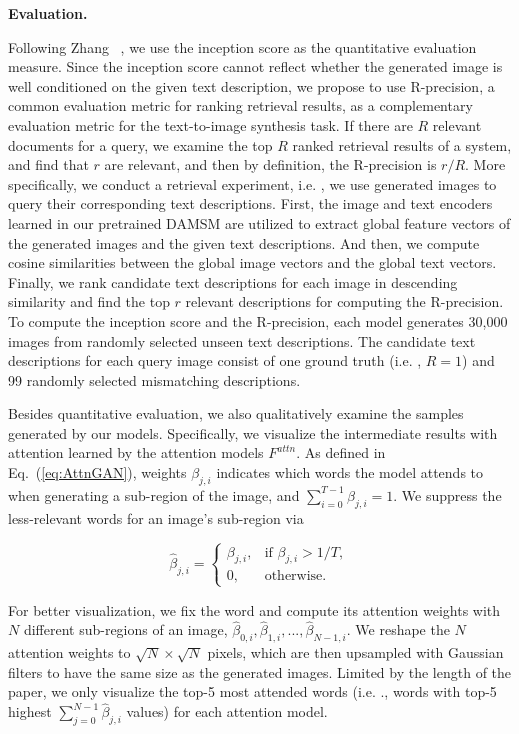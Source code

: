 \textbf{Evaluation. }{ Following Zhang \etal~\cite{Han16stackgan}, we use the inception score \cite{Salimans2016} as the quantitative evaluation measure. Since the inception score cannot reflect whether the generated image is well conditioned on the given text description, we propose to use R-precision, a common evaluation metric for ranking retrieval results, as a complementary evaluation metric for the text-to-image synthesis task. If there are $R$ relevant documents for a query, we examine the top $R$ ranked retrieval results of a system, and find that $r$ are relevant, and then by definition, the R-precision is ${r}/{R}$. More specifically, we conduct a retrieval experiment, i.e. , we use generated images to query their corresponding text descriptions. First, the image and text encoders learned in our pretrained DAMSM are utilized to extract global feature vectors of the generated images and the given text descriptions. And then, we compute cosine similarities between the global image vectors and the global text vectors. Finally, we rank candidate text descriptions for each image in descending similarity and find the top $r$ relevant descriptions for computing the R-precision. To compute the inception score and the R-precision, each model generates 30,000 images from randomly selected unseen text descriptions. The candidate text descriptions for each query image consist of one ground truth (i.e. , $R=1$) and 99 randomly selected mismatching descriptions. 

Besides quantitative evaluation, we also qualitatively examine the samples generated by our models.  Specifically, we visualize the intermediate results with attention learned by the attention models $F^{attn}$. As defined in Eq.~(\ref{eq:AttnGAN}), weights $\beta_{j,i}$ indicates which words the model attends to when generating a sub-region of the image, and $\sum_{i=0}^{T-1} \beta_{j,i} = 1$. We suppress the less-relevant words for an image's sub-region via

\begin{equation}\label{eq:suppress}
    \hat{\beta}_{j,i} = 
        \begin{cases}
            \beta_{j,i}, & \text{if } \beta_{j,i} > 1/T,\\
                0,              & \text{otherwise.}
        \end{cases}
 \end{equation}

For better visualization, we fix the word and compute its attention weights with $N$ different sub-regions of an image, $\hat{\beta}_{0,i}, \hat{\beta}_{1,i}, ..., \hat{\beta}_{N-1,i}$. We reshape the $N$ attention weights to $\sqrt{N}\times\sqrt{N}$ pixels, which are then upsampled with Gaussian filters to have the same size as the generated images. Limited by the length of the paper, we only visualize the top-5 most attended words (i.e. ., words with top-5 highest $\sum_{j=0}^{N-1} \hat{\beta}_{j,i}$ values) for each attention model. }

